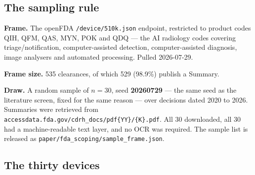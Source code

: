 \documentclass[11pt,a4paper]{article}
\begin{document}
\subsection{The sampling rule}

\textbf{Frame.} The openFDA \texttt{/device/510k.json} endpoint, restricted to product
codes QIH, QFM, QAS, MYN, POK and QDQ --- the AI radiology codes covering
triage/notification, computer-assisted detection, computer-assisted diagnosis, image
analysers and automated processing. Pulled 2026-07-29.

\textbf{Frame size.} 535 clearances, of which 529 (98.9\%) publish a Summary.

\textbf{Draw.} A random sample of $n = 30$, seed \textbf{20260729} --- the same seed
as the literature screen, fixed for the same reason --- over decisions dated 2020 to
2026. Summaries were retrieved from
\texttt{accessdata.fda.gov/cdrh\_docs/pdf\{YY\}/\{K\}.pdf}. All 30 downloaded, all 30
had a machine-readable text layer, and no OCR was required. The sample list is
released as \texttt{paper/fda\_scoping/sample\_frame.json}.

\subsection{The thirty devices}
\end{document}

